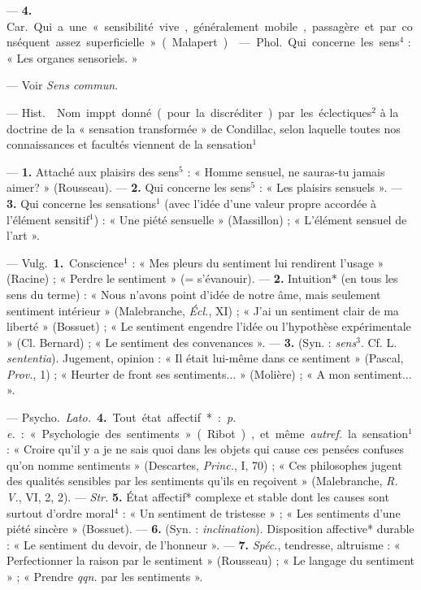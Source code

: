 \begin{itemize}[leftmargin=1cm, label=, itemsep=1pt]
— {\bf 4.} \si{Car.} Qui a une « sensibilité vive, généralement mobile,
passagère et par conséquent assez superficielle » (Malapert).

 — \si{Phol.} Qui concerne les
sens$^4$ : « Les organes sensoriels. »

 — Voir {\it Sens commun}.

 — \si{Hist.}  Nom imppt. donné (pour la
discréditer) par les éclectiques$^2$ à la doctrine de la « sensation
transformée » de Condillac, selon laquelle toutes nos connaissances et
facultés viennent de la sensation$^1$

 —  {\bf 1.} Attaché aux plaisirs
des sens$^5$ : « Homme sensuel, ne
sauras-tu jamais aimer? » (Rousseau). —  {\bf 2.} Qui concerne les
sens$^5$ : « Les plaisirs sensuels ». —  {\bf 3.} Qui concerne les
sensations$^1$ (avec l’idée d’une valeur propre accordée à l'élément
sensitif$^1$) : « Une piété sensuelle » (Massillon) ; « L'élément sensuel de
l’art ».

 — \si{Vulg.} {\bf 1.} Conscience$^1$ : « Mes pleurs du
sentiment lui rendirent l’usage » (Racine) ; « Perdre le sentiment » (=
s’évanouir). — {\bf 2.} Intuition* (en tous les sens du terme) : « Nous n’avons
point d'idée de notre âme, mais seulement sentiment intérieur » (Malebranche,
{\it Écl.}, XI) ; « J’ai un sentiment clair de ma liberté » (Bossuet) ; « Le
sentiment engendre l’idée ou l'hypothèse expérimentale » (Cl. Bernard) ; « Le
sentiment des convenances ». — {\bf 3.} (Syn. : {\it sens}$^3$. Cf. L.
{\it sententia}). Jugement, opinion : « Il était lui-même dans ce
sentiment » (Pascal, {\it Prov.}, 1) ; « Heurter de front ses
sentiments... » (Molière) ; « A mon sentiment... ».

— \si{Psycho.} {\it Lato.} {\bf 4.} Tout état affectif* : {\it p. e.} :
« Psychologie des sentiments » (Ribot), et même {\it autref.} la
sensation$^1$ : « Croire qu'il y a je ne sais quoi dans les objets qui cause
ces pensées confuses qu’on nomme sentiments » (Descartes, {\it Princ.}, I,
70) ; « Ces philosophes jugent des qualités sensibles par les sentiments
qu'ils en reçoivent » (Malebranche, {\it R. V.}, VI, 2, 2). — {\it Str.}
{\bf 5.} État affectif* complexe et stable dont les causes sont surtout
d'ordre moral$^4$ : « Un sentiment de tristesse » ; « Les sentiments d’une piété sincère » (Bossuet). — {\bf 6.} (Syn. : {\it inclination}).
Disposition affective* durable : « Le sentiment du devoir, de l'honneur ». —
{\bf 7.} {\it Spéc.}, tendresse, altruisme : « Perfectionner la raison par le
sentiment » (Rousseau) ; « Le
langage du sentiment » ; « Prendre {\it qqn.} par les sentiments ».


\end{itemize}
